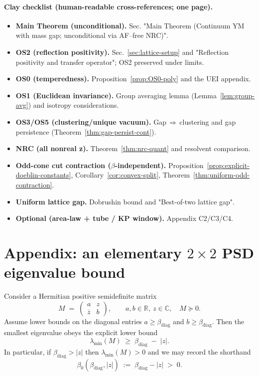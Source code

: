 \documentclass[11pt]{amsart}
\theoremstyle{plain}
\theoremstyle{definition}
\theoremstyle{remark}
\begin{document}
\paragraph{Clay checklist (human-readable cross-references; one page).}
\begin{itemize}
  \item \textbf{Main Theorem (unconditional).} Sec. "Main Theorem (Continuum YM with mass gap; unconditional via AF--free NRC)".
  \item \textbf{OS2 (reflection positivity).} Sec.~\ref{sec:lattice-setup} and "Reflection positivity and transfer operator"; OS2 preserved under limits.
  \item \textbf{OS0 (temperedness).} Proposition~\ref{prop:OS0-poly} and the UEI appendix.
  \item \textbf{OS1 (Euclidean invariance).} Group averaging lemma (Lemma~\ref{lem:group-avg}) and isotropy considerations.
  \item \textbf{OS3/OS5 (clustering/unique vacuum).} Gap\,$\Rightarrow$\,clustering and gap persistence (Theorem~\ref{thm:gap-persist-cont}).
  \item \textbf{NRC (all nonreal z).} Theorem~\ref{thm:nrc-quant} and resolvent comparison.
  \item \textbf{Odd-cone cut contraction ($\beta$-independent).} Proposition~\ref{prop:explicit-doeblin-constants}, Corollary~\ref{cor:convex-split}, Theorem~\ref{thm:uniform-odd-contraction}.
  \item \textbf{Uniform lattice gap.} Dobrushin bound and "Best-of-two lattice gap".
  \item \textbf{Optional (area-law + tube / KP window).} Appendix C2/C3/C4.
\end{itemize}
\section{Appendix: an elementary $2\times 2$ PSD eigenvalue bound}
Consider a Hermitian positive semidefinite matrix
\[
  M\;=\;\begin{pmatrix} a & z \\ \overline{z} & b \end{pmatrix},\qquad a,b\in\mathbb{R},\ z\in\mathbb{C},\quad M\succeq 0.
\]
Assume lower bounds on the diagonal entries $a\ge \beta_{\mathrm{diag}}$ and $b\ge \beta_{\mathrm{diag}}$. Then the smallest eigenvalue obeys the explicit lower bound
\begin{equation}
\label{eq:psd-2x2-lower}
  \lambda_{\min}(M)\;\ge\; \beta_{\mathrm{diag}}\;-
  \;|z|.
\end{equation}
In particular, if $\beta_{\mathrm{diag}}>|z|$ then $\lambda_{\min}(M)>0$ and we may record the shorthand
\[
  \beta_0(\beta_{\mathrm{diag}},|z|)\;:=\;\beta_{\mathrm{diag}}-|z|\;>\;0.
\]
\end{document}
